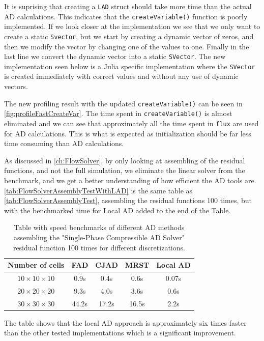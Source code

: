 It is suprising that creating a \texttt{LAD} struct should take more time than the actual AD calculations. This indicates that the \texttt{createVariable()} function is poorly implemented. If we look closer at the implementation we see that we only want to create a static \texttt{Svector}, but we start by creating a dynamic vector of zeros, and then we modify the vector by changing one of the values to one. Finally in the last line we convert the dynamic vector into a static \texttt{SVector}. The new implementation seen below is a Julia specific implementation where the \texttt{SVector} is created immediately with correct values and without any use of dynamic vectors.

The new profiling result with the updated \texttt{createVariable()} can be seen in \autoref{fig:profileFastCreateVar}. The time spent in \texttt{createVariable()} is almost eliminated and we can see that approximately all the time spent in \texttt{flux} are used for AD calculations. This is what is expected as initialization should be far less time consuming than AD calculations. 

As discussed in \autoref{ch:FlowSolver}, by only looking at assembling of the residual functions, and not the full simulation, we eliminate the linear solver from the benchmark, and we get a better understanding of how efficient the AD tools are. \autoref{tab:FlowSolverAssemblyTestWithLAD} is the same table as \autoref{tab:FlowSolverAssemblyTest}, assembling the residual functions 100 times, but with the benchmarked time for Local AD added to the end of the Table.
\begin{table}[htb]
    \centering
    \caption{Table with speed benchmarks of different AD methods assembling the "Single-Phase Compressible AD Solver" residual function 100 times for different discretizations.}
    \label{tab:FlowSolverAssemblyTestWithLAD}
    \def\arraystretch{1.5}
    \begin{tabular}{ccccc}
    \textbf{Number of cells} & \textbf{FAD} & \textbf{CJAD} & \textbf{MRST} & \textbf{Local AD}\\
        \hline
         $10\times10\times10$ & 0.9s & 0.4s & 0.6s & 0.07s \\  
         $20\times20\times20$ & 9.3s & 4.0s & 3.6s & 0.6s \\ 
         $30\times30\times30$ & 44.2s& 17.2s& 16.5s & 2.2s \\ \hline
    \end{tabular}
\end{table}
The table shows that the local AD approach is approximately six times faster than the other tested implementations which is a significant improvement. 

